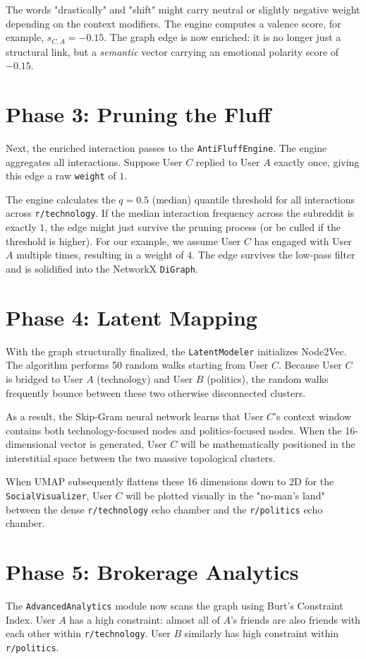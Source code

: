\documentclass[12pt,a4paper]{report}
\begin{document}
The words "drastically" and "shift" might carry neutral or slightly negative weight depending on the context modifiers. The engine computes a valence score, for example, $s_{C,A} = -0.15$. The graph edge is now enriched: it is no longer just a structural link, but a \textit{semantic} vector carrying an emotional polarity score of $-0.15$.

\section{Phase 3: Pruning the Fluff}
Next, the enriched interaction passes to the \texttt{AntiFluffEngine}. The engine aggregates all interactions. Suppose User $C$ replied to User $A$ exactly once, giving this edge a raw \texttt{weight} of $1$.

The engine calculates the $q=0.5$ (median) quantile threshold for all interactions across \texttt{r/technology}. If the median interaction frequency across the subreddit is exactly $1$, the edge might just survive the pruning process (or be culled if the threshold is higher). For our example, we assume User $C$ has engaged with User $A$ multiple times, resulting in a weight of $4$. The edge survives the low-pass filter and is solidified into the NetworkX \texttt{DiGraph}.

\section{Phase 4: Latent Mapping}
With the graph structurally finalized, the \texttt{LatentModeler} initializes Node2Vec.
The algorithm performs 50 random walks starting from User $C$. Because User $C$ is bridged to User $A$ (technology) and User $B$ (politics), the random walks frequently bounce between these two otherwise disconnected clusters.

As a result, the Skip-Gram neural network learns that User $C$'s context window contains both technology-focused nodes and politics-focused nodes. When the 16-dimensional vector is generated, User $C$ will be mathematically positioned in the interstitial space between the two massive topological clusters. 

When UMAP subsequently flattens these 16 dimensions down to 2D for the \texttt{SocialVisualizer}, User $C$ will be plotted visually in the "no-man's land" between the dense \texttt{r/technology} echo chamber and the \texttt{r/politics} echo chamber.

\section{Phase 5: Brokerage Analytics}
The \texttt{AdvancedAnalytics} module now scans the graph using Burt's Constraint Index. 
User $A$ has a high constraint: almost all of $A$'s friends are also friends with each other within \texttt{r/technology}. 
User $B$ similarly has high constraint within \texttt{r/politics}.
\end{document}
